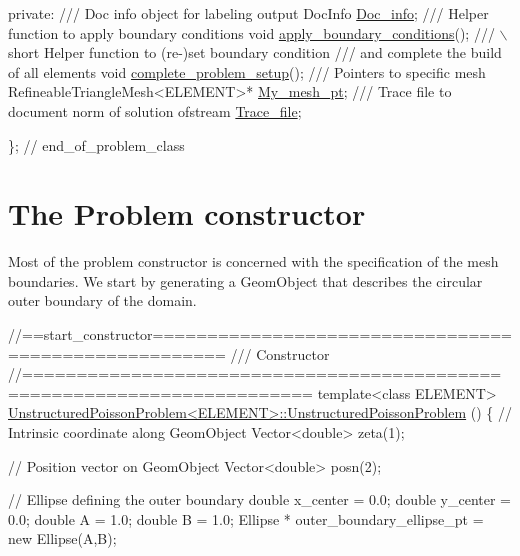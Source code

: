 \begin{DoxyCodeInclude}
\textcolor{keyword}{private}:
\textcolor{comment}{}
\textcolor{comment}{ /// Doc info object for labeling output}
\textcolor{comment}{} DocInfo \hyperlink{classUnstructuredPoissonProblem_a5c4c29b1c95cd63055e5aced124ca708}{Doc\_info};
\textcolor{comment}{}
\textcolor{comment}{ /// Helper function to apply boundary conditions}
\textcolor{comment}{} \textcolor{keywordtype}{void} \hyperlink{classUnstructuredPoissonProblem_ace8b8b3097ae2024a0589b2bf9b4ee7b}{apply\_boundary\_conditions}();
\textcolor{comment}{}
\textcolor{comment}{ /// \(\backslash\)short Helper function to (re-)set boundary condition}
\textcolor{comment}{ /// and complete the build of  all elements}
\textcolor{comment}{} \textcolor{keywordtype}{void} \hyperlink{classUnstructuredPoissonProblem_a5cbf00790e8469b43c64c6aaadfe7b41}{complete\_problem\_setup}();
\textcolor{comment}{}
\textcolor{comment}{ /// Pointers to specific mesh}
\textcolor{comment}{} RefineableTriangleMesh<ELEMENT>* \hyperlink{classUnstructuredPoissonProblem_af95c713f5db16c288e307768b6bf9bb8}{My\_mesh\_pt};
\textcolor{comment}{}
\textcolor{comment}{ /// Trace file to document norm of solution}
\textcolor{comment}{} ofstream \hyperlink{classUnstructuredPoissonProblem_ac7fdb8fb9a886ced0ee7244890406d90}{Trace\_file};

\}; \textcolor{comment}{// end\_of\_problem\_class}

\end{DoxyCodeInclude}




 

\hypertarget{index_constructor}{}\section{The Problem constructor}\label{index_constructor}
Most of the problem constructor is concerned with the specification of the mesh boundaries. We start by generating a {\ttfamily Geom\+Object} that describes the circular outer boundary of the domain.


\begin{DoxyCodeInclude}
\textcolor{comment}{//==start\_constructor=====================================================}
\textcolor{comment}{/// Constructor}
\textcolor{comment}{}\textcolor{comment}{//========================================================================}
\textcolor{keyword}{template}<\textcolor{keyword}{class} ELEMENT>
\hyperlink{classUnstructuredPoissonProblem_a26e7610a714aea17c9278beec4842371}{UnstructuredPoissonProblem<ELEMENT>::UnstructuredPoissonProblem}
      ()
\{          
 \textcolor{comment}{// Intrinsic coordinate along GeomObject}
 Vector<double> zeta(1);

 \textcolor{comment}{// Position vector on GeomObject}
 Vector<double> posn(2);
 
 \textcolor{comment}{// Ellipse defining the outer boundary}
 \textcolor{keywordtype}{double} x\_center = 0.0;
 \textcolor{keywordtype}{double} y\_center = 0.0;
 \textcolor{keywordtype}{double} A = 1.0;
 \textcolor{keywordtype}{double} B = 1.0;
 Ellipse * outer\_boundary\_ellipse\_pt = \textcolor{keyword}{new} Ellipse(A,B);

\end{DoxyCodeInclude}



